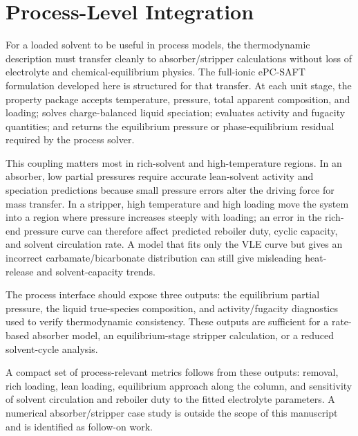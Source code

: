 \section{Process-Level Integration}\label{sec:process-implications}
For a loaded \MEA solvent to be useful in process models, the thermodynamic description must transfer cleanly to absorber/stripper calculations without loss of electrolyte and chemical-equilibrium physics.  The full-ionic ePC-SAFT formulation developed here is structured for that transfer.  At each unit stage, the property package accepts temperature, pressure, total apparent composition, and loading; solves charge-balanced liquid speciation; evaluates activity and fugacity quantities; and returns the \COtwo equilibrium pressure or phase-equilibrium residual required by the process solver.

This coupling matters most in rich-solvent and high-temperature regions.  In an absorber, low \COtwo partial pressures require accurate lean-solvent activity and speciation predictions because small pressure errors alter the driving force for mass transfer.  In a stripper, high temperature and high loading move the system into a region where \COtwo pressure increases steeply with loading; an error in the rich-end pressure curve can therefore affect predicted reboiler duty, cyclic capacity, and solvent circulation rate.  A model that fits only the VLE curve but gives an incorrect carbamate/bicarbonate distribution can still give misleading heat-release and solvent-capacity trends.

The process interface should expose three outputs: the \COtwo equilibrium partial pressure, the liquid true-species composition, and activity/fugacity diagnostics used to verify thermodynamic consistency.  These outputs are sufficient for a rate-based absorber model, an equilibrium-stage stripper calculation, or a reduced solvent-cycle analysis.

A compact set of process-relevant metrics follows from these outputs: \COtwo removal, rich loading, lean loading, equilibrium approach along the column, and sensitivity of solvent circulation and reboiler duty to the fitted electrolyte parameters.  A numerical absorber/stripper case study is outside the scope of this manuscript and is identified as follow-on work.

